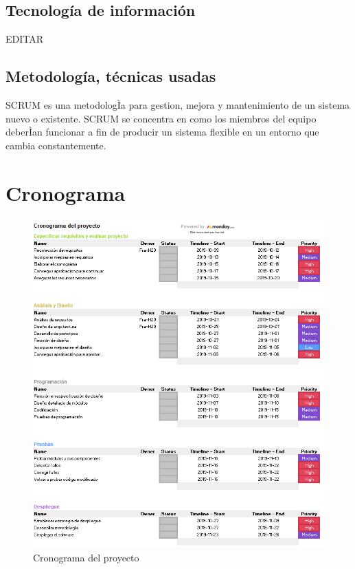 \documentclass[preprint,12pt]{elsarticle}
\begin{document}

\subsection{\textbf{Tecnología de información}}

EDITAR\\


\subsection{\textbf{Metodología, técnicas usadas}}

SCRUM es una metodologÌa para gestion, mejora y mantenimiento de un sistema nuevo o existente. SCRUM se concentra en como los miembros del equipo deberÌan funcionar a fin de producir un sistema flexible en un entorno que cambia constantemente. 




\section{Cronograma}

\begin{figure}[htb]
	\begin{center}
		\includegraphics[width=14cm]{./IMAGENES/Gannt} 
		\caption{Cronograma del proyecto}
	\end{center}
\end{figure}
\end{document}
